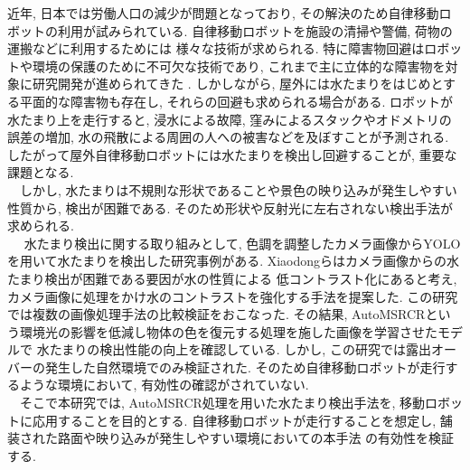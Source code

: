 \documentclass[10pt]{jarticle}
\begin{document}
    近年, 日本では労働人口の減少が問題となっており, 
    その解決のため自律移動ロボットの利用が試みられている. 
    自律移動ロボットを施設の清掃や警備, 荷物の運搬などに利用するためには
    様々な技術が求められる. 
    特に障害物回避はロボットや環境の保護のために不可欠な技術であり, 
    これまで主に立体的な障害物を対象に研究開発が進められてきた\cite{朝田2019} . 
    しかしながら, 屋外には水たまりをはじめとする平面的な障害物も存在し, 
    それらの回避も求められる場合がある. ロボットが水たまり上を走行すると, 
    浸水による故障, 窪みによるスタックやオドメトリの誤差の増加, 
    水の飛散による周囲の人への被害などを及ぼすことが予測される. 
    したがって屋外自律移動ロボットには水たまりを検出し回避することが, 
    重要な課題となる.\\ 
    　しかし, 水たまりは不規則な形状であることや景色の映り込みが発生しやすい性質から, 
    検出が困難である. そのため形状や反射光に左右されない検出手法が求められる.\\
    　 水たまり検出に関する取り組みとして, 
    色調を調整したカメラ画像からYOLOを用いて水たまりを検出した研究事例がある. 
    Xiaodongら\cite{Xiaodong2022}はカメラ画像からの水たまり検出が困難である要因が水の性質による
    低コントラスト化にあると考え, カメラ画像に処理をかけ水のコントラストを強化する手法を提案した. 
    この研究では複数の画像処理手法の比較検証をおこなった. 
    その結果, AutoMSRCRという環境光の影響を低減し物体の色を復元する処理を施した画像を学習させたモデルで
    水たまりの検出性能の向上を確認している. 
    しかし, この研究では露出オーバーの発生した自然環境でのみ検証された.  
    そのため自律移動ロボットが走行するような環境において, 有効性の確認がされていない.   \\
    　そこで本研究では, AutoMSRCR処理を用いた水たまり検出手法を, 移動ロボットに応用することを目的とする. 
    自律移動ロボットが走行することを想定し, 舗装された路面や映り込みが発生しやすい環境においての本手法
    の有効性を検証する.
\end{document}
